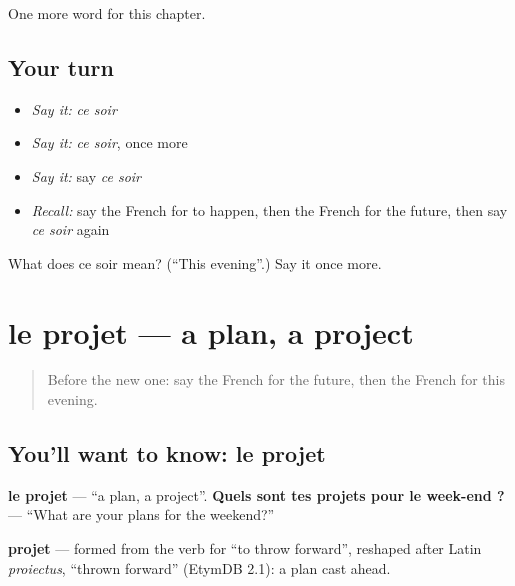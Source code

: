 \begin{grammarlens}[title={What you've built}]
One more word for this chapter.
\end{grammarlens}

\subsection*{Your turn}
\begin{itemize}
\raggedright
  \item \emph{Say it:} \emph{ce soir}
  \item \emph{Say it:} \emph{ce soir}, once more
  \item \emph{Say it:} say \emph{ce soir}
  \item \emph{Recall:} say the French for to happen, then the French for the future, then say \emph{ce soir} again
\end{itemize}

\begin{tcolorbox}[breakable,colback=teal!4,colframe=teal!35!black,title={Before you move on}]
What does ce soir mean? (\textquotedblleft{}This evening\textquotedblright{}.) Say it once more.
\end{tcolorbox}
\section[le projet]{le projet — a plan, a project}

\label{lesson:FR-C141-le-projet}



\begin{quote}
Before the new one: say the French for the future, then the French for this evening.
\end{quote}

\subsection*{You'll want to know: le projet}
\textbf{le projet} — \textquotedblleft{}a plan, a project\textquotedblright{}. \textbf{Quels sont tes projets pour le week-end ?} — \textquotedblleft{}What are your plans for the weekend?\textquotedblright{}

\begin{cousinweb}
\textbf{projet} — formed from the verb for \textquotedblleft{}to throw forward\textquotedblright{}, reshaped after Latin \emph{proiectus}, \textquotedblleft{}thrown forward\textquotedblright{} (EtymDB 2.1): a plan cast ahead.
\end{cousinweb}

